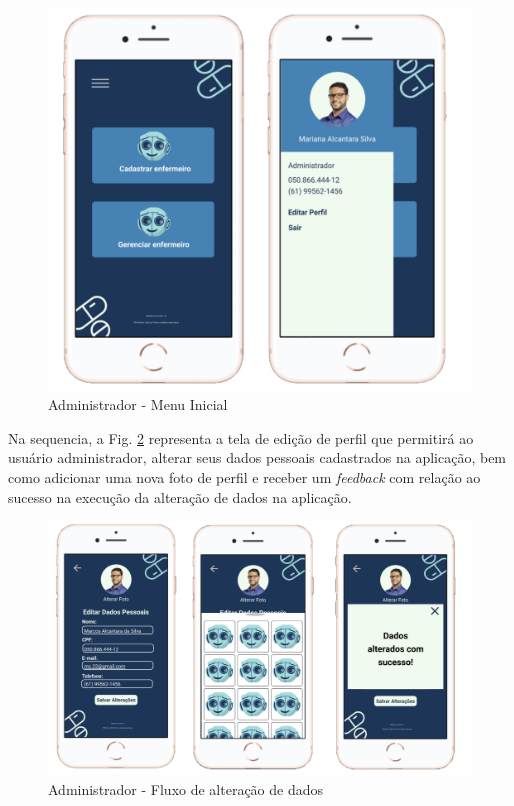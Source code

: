 \begin{figure}[H]
    \centering
    \includegraphics[width=12cm]{figuras/software/Atual_prototipo/Admin_TelaInicial_e_Sidebar.png}
    \caption{Administrador - Menu Inicial}
    \label{fig:prototipo_admin_tela_inicial_e_sidebar}
\end{figure}

Na sequencia, a Fig. \ref{fig:prototipo_admin_alterarDados} representa a tela de edição de perfil que permitirá ao usuário administrador, alterar seus dados pessoais cadastrados na aplicação, bem como adicionar uma nova foto de perfil e receber um \textit{feedback} com relação ao sucesso na execução da alteração de dados na aplicação.

\begin{figure}[H]
    \centering
    \includegraphics[width=15cm]{figuras/software/Atual_prototipo/Admin_AlterarDados.png}
    \caption{Administrador - Fluxo de alteração de dados}
    \label{fig:prototipo_admin_alterarDados}
\end{figure}

